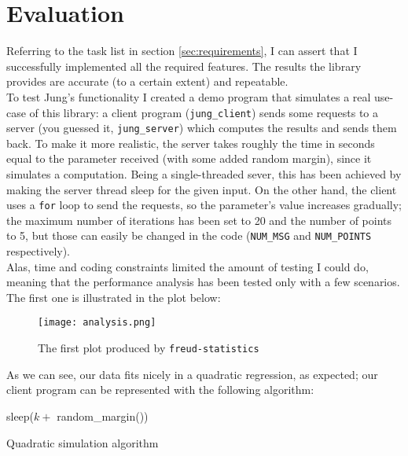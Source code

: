 \chapter{Evaluation}


    Referring to the task list in section \ref{sec:requirements}, I can assert that I successfully implemented
    all the required features. The results the library provides are accurate (to a certain extent) and repeatable.\\

    To test Jung's functionality I created a demo program that simulates a real use-case of this library:
    a client program (\texttt{jung\_client}) sends some requests to a server (you guessed it, 
    \texttt{jung\_server}) which computes the results and sends them back. To make it more realistic,
    the server takes roughly the time in seconds equal to the parameter received (with some added
    random margin), since it simulates a computation. Being a single-threaded sever, this has been
    achieved by making the server thread sleep for the given input. On the other hand, the client
    uses a \texttt{for} loop to send the requests, so the parameter's value increases gradually;
    the maximum number of iterations has been set to 20 and the number of points to 5,
    but those can easily be changed in the code (\texttt{NUM\_MSG} and \texttt{NUM\_POINTS} respectively).\\

    Alas, time and coding constraints limited the amount of testing I could do,
    meaning that the performance analysis has been tested only with a few scenarios. The first one
    is illustrated in the plot below:\\

    \begin{figure}[H]
        \centering
        \texttt{[image: analysis.png]}
        \caption{The first plot produced by \texttt{freud-statistics}}
        \label{fig:analysis1}
    \end{figure}

    As we can see, our data fits nicely in a quadratic regression, as expected;
    our client program can be represented with the following algorithm:\\

    \begin{algorithm}[H]
         {
             {
                 {
                    sleep($k + $ random\_margin())\;
                }
            }
        }
        \caption{Quadratic simulation algorithm}
    \end{algorithm}

